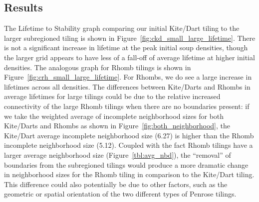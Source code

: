 \documentclass[a4paper,11pt]{report}
\begin{document}
\subsection*{Results}
The Lifetime to Stability graph comparing our initial Kite/Dart tiling to the larger subregioned tiling is shown in Figure~\ref{fig:ckd_small_large_lifetime}. There is not a significant increase in lifetime at the peak initial soup densities, though the larger grid appears to have less of a fall-off of average lifetime at higher initial densities. The analogous graph for Rhomb tilings is shown in Figure~\ref{fig:crh_small_large_lifetime}. For Rhombs, we do see a large increase in lifetimes across all densities. The differences between Kite/Darts and Rhombs in average lifetimes for large tilings could be due to the relative increased connectivity of the large Rhomb tilings when there are no boundaries present: if we take the weighted average of incomplete neighborhood sizes for both Kite/Darts and Rhombs as shown in Figure~\ref{fig:both_neighborhood}, the Kite/Dart average incomplete neighborhood size (6.27) is higher than the Rhomb incomplete neighborhood size (5.12). Coupled with the fact Rhomb tilings have a larger average neighborhood size (Figure~\ref{tbl:avg_nbd}), the ``removal'' of boundaries from the subregioned tilings would produce a more dramatic change in neighborhood sizes for the Rhomb tiling in comparison to the Kite/Dart tiling. This difference could also potentially be due to other factors, such as the geometric or spatial orientation of the two different types of Penrose tilings.

\end{document}
